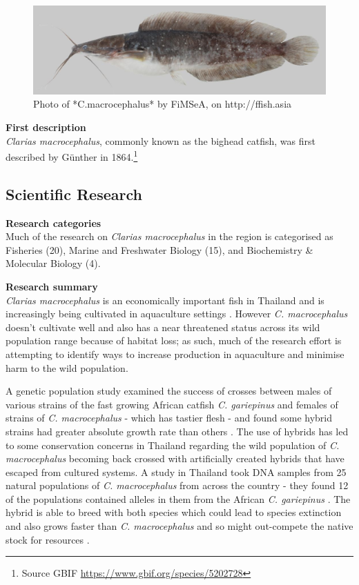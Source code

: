 \documentclass[]{book}
\let\rmarkdownfootnote\footnote%
\def\footnote{\protect\rmarkdownfootnote}
\theoremstyle{definition}
\theoremstyle{definition}
\theoremstyle{definition}
\theoremstyle{remark}
\begin{document}
\begin{figure}

{\centering \includegraphics[width=14.22in]{images_species/152_Clarias_macrocephalus_CTU-P00116} 

}

\caption{Photo of *C.macrocephalus* by FiMSeA, on http://ffish.asia}\label{fig:unnamed-chunk-2}
\end{figure}

\textbf{First description}\\
\emph{Clarias macrocephalus}, commonly known as the bighead catfish, was
first described by Günther in 1864.\footnote{Source GBIF
  \url{https://www.gbif.org/species/5202728}}

\hypertarget{scientific-research}{%
\subsection{Scientific Research}\label{scientific-research}}

\textbf{Research categories}\\
Much of the research on \emph{Clarias macrocephalus} in the region is
categorised as Fisheries (20), Marine and Freshwater Biology (15), and
Biochemistry \& Molecular Biology (4).

\textbf{Research summary}\\
\emph{Clarias macrocephalus} is an economically important fish in
Thailand and is increasingly being cultivated in aquaculture settings
\citep{Na_Nakorn_2004}. However \emph{C. macrocephalus} doesn't
cultivate well and also has a near threatened status across its wild
population range because of habitat loss; as such, much of the research
effort is attempting to identify ways to increase production in
aquaculture and minimise harm to the wild population.

A genetic population study examined the success of crosses between males
of various strains of the fast growing African catfish \emph{C.
gariepinus} and females of strains of \emph{C. macrocephalus} - which
has tastier flesh - and found some hybrid strains had greater absolute
growth rate than others \citep{Koolboon_2014}. The use of hybrids has
led to some conservation concerns in Thailand regarding the wild
population of \emph{C. macrocephalus} becoming back crossed with
artificially created hybrids that have escaped from cultured systems. A
study in Thailand took DNA samples from 25 natural populations of
\emph{C. macrocephalus} from across the country - they found 12 of the
populations contained alleles in them from the African \emph{C.
gariepinus} \citep{Na_Nakorn_2004}. The hybrid is able to breed with
both species which could lead to species extinction and also grows
faster than \emph{C. macrocephalus} and so might out-compete the native
stock for resources \citep{Na_Nakorn_2004}.
\end{document}

